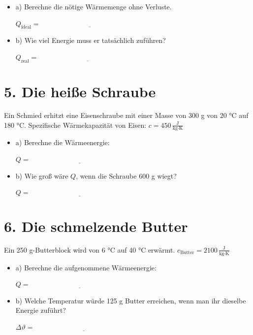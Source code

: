 \documentclass[a4paper]{article}
\begin{document}
	\begin{itemize}
		\item a) Berechne die nötige Wärmemenge ohne Verluste.
		
		\vspace{1em}
		\( Q_\text{ideal} = \underline{\hspace{6cm}} \)
		
		\item b) Wie viel Energie muss er tatsächlich zuführen?
		
		\vspace{1em}
		\( Q_\text{real} = \underline{\hspace{6cm}} \)
	\end{itemize}
	

\section*{5. Die heiße Schraube}

Ein Schmied erhitzt eine Eisenschraube mit einer Masse von 300 g von 20 °C auf 180 °C.  
Spezifische Wärmekapazität von Eisen: \( c = 450\, \frac{\text{J}}{\text{kg}\cdot\text{K}} \)

\begin{itemize}
	\item a) Berechne die Wärmeenergie:
	
	\vspace{1em}
	\( Q = \underline{\hspace{6cm}} \)
	
	\item b) Wie groß wäre \( Q \), wenn die Schraube 600 g wiegt?
	
	\vspace{1em}
	\( Q = \underline{\hspace{6cm}} \)
\end{itemize}

\hrulefill

\section*{6. Die schmelzende Butter }
 
 Ein 250 g-Butterblock wird von 6 °C auf 40 °C erwärmt.  
\( c_\text{Butter} = 2100\, \frac{\text{J}}{\text{kg}\cdot\text{K}} \)

\begin{itemize}
	\item a) Berechne die aufgenommene Wärmeenergie:
	
	\vspace{1em}
	\( Q = \underline{\hspace{6cm}} \)
	
	\item b) Welche Temperatur würde 125 g Butter erreichen, wenn man ihr dieselbe Energie zuführt?
	
	\vspace{1em}
	\( \Delta \vartheta = \underline{\hspace{6cm}} \)
\end{itemize}
\end{document}
